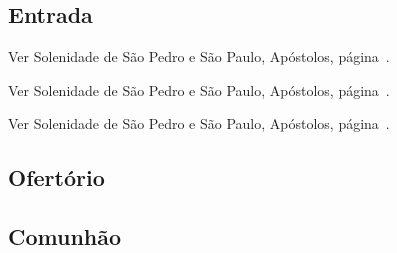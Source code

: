 
\subsection{Entrada}\label{subsection:communia/commune-apostolorum/introitus}

\begin{rubrica}
  Ver Solenidade de São Pedro e São Paulo, Apóstolos, página~\pageref{subsection:proprium-sanctorum/sanctorum-petri-et-pauli-apostolorum/psalmus-responsorius}.
\end{rubrica}
\vspace{-2mm}

\begin{rubrica}
  Ver Solenidade de São Pedro e São Paulo, Apóstolos, página~\pageref{subsection:proprium-sanctorum/sanctorum-petri-et-pauli-apostolorum/alleluia}.
\end{rubrica}
\vspace{-2mm}

\begin{rubrica}
  Ver Solenidade de São Pedro e São Paulo, Apóstolos, página~\pageref{subsection:proprium-sanctorum/sanctorum-petri-et-pauli-apostolorum/psalmus-alleluiaticus}.
\end{rubrica}
\vspace{-2mm}

\subsection{Ofertório}\label{subsection:communia/commune-apostolorum/offertorium}

\AllowPageBreak

\subsection{Comunhão}\label{subsection:communia/commune-apostolorum/communio}
